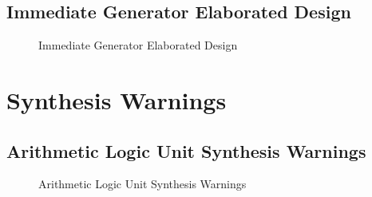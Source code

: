 \documentclass[
    a4paper, %
	12pt, %
    ]{CSSullivanBusinessReport}
\begin{document}
\begin{fullwidth}
\subsection{Immediate Generator Elaborated Design} %
\begin{figure}[H]
    \centering
    \captionsetup{style=widetable}
    \caption{Immediate Generator Elaborated Design}
    \label{fig:ALUElaboratedDesign}
\end{figure}


\section{Synthesis Warnings} %

\subsection{Arithmetic Logic Unit Synthesis Warnings} %
\begin{figure}[H]
    \captionsetup{style=widetable}
    \caption{Arithmetic Logic Unit Synthesis Warnings}
    \label{fig:ALUSynthesisWarnings}
\end{figure}


\end{fullwidth}
\end{document}
